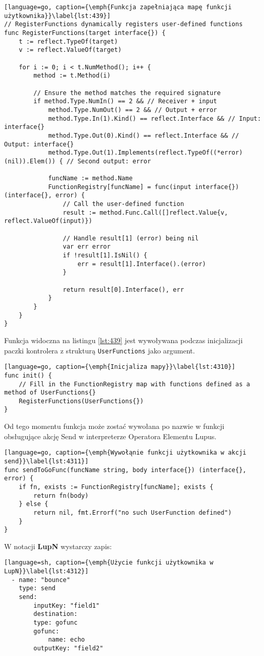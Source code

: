 \begin{lstlisting}[language=go, caption={\emph{Funkcja zapełniająca mapę funkcji użytkownika}}\label{lst:439}]
// RegisterFunctions dynamically registers user-defined functions
func RegisterFunctions(target interface{}) {
	t := reflect.TypeOf(target)
	v := reflect.ValueOf(target)

	for i := 0; i < t.NumMethod(); i++ {
		method := t.Method(i)

		// Ensure the method matches the required signature
		if method.Type.NumIn() == 2 && // Receiver + input
			method.Type.NumOut() == 2 && // Output + error
			method.Type.In(1).Kind() == reflect.Interface && // Input: interface{}
			method.Type.Out(0).Kind() == reflect.Interface && // Output: interface{}
			method.Type.Out(1).Implements(reflect.TypeOf((*error)(nil)).Elem()) { // Second output: error

			funcName := method.Name
			FunctionRegistry[funcName] = func(input interface{}) (interface{}, error) {
				// Call the user-defined function
				result := method.Func.Call([]reflect.Value{v, reflect.ValueOf(input)})

				// Handle result[1] (error) being nil
				var err error
				if !result[1].IsNil() {
					err = result[1].Interface().(error)
				}

				return result[0].Interface(), err
			}
		}
	}
}
\end{lstlisting}

Funkcja widoczna na listingu \ref{lst:439} jest wywoływana podczas inicjalizacji paczki kontrolera z strukturą \texttt{UserFunctions} jako argument.

\begin{lstlisting}[language=go, caption={\emph{Inicjaliza mapy}}\label{lst:4310}]
func init() {
    // Fill in the FunctionRegistry map with functions defined as a method of UserFunctions{}
	RegisterFunctions(UserFunctions{})
}
\end{lstlisting}


Od tego momentu funkcja może zostać wywołana po nazwie w funkcji obsługujące akcję Send w interpreterze Operatora Elementu Lupus.

\begin{lstlisting}[language=go, caption={\emph{Wywołąnie funkcji użytkownika w akcji send}}\label{lst:4311}]
func sendToGoFunc(funcName string, body interface{}) (interface{}, error) {
	if fn, exists := FunctionRegistry[funcName]; exists {
		return fn(body)
	} else {
		return nil, fmt.Errorf("no such UserFunction defined")
	}
}
\end{lstlisting}

W notacji \textbf{LupN} wystarczy zapis:

\begin{lstlisting}[language=sh, caption={\emph{Użycie funkcji użytkownika w LupN}}\label{lst:4312}]
  - name: "bounce"
    type: send
    send:
        inputKey: "field1"
        destination:
        type: gofunc
        gofunc:
            name: echo
        outputKey: "field2"
\end{lstlisting}